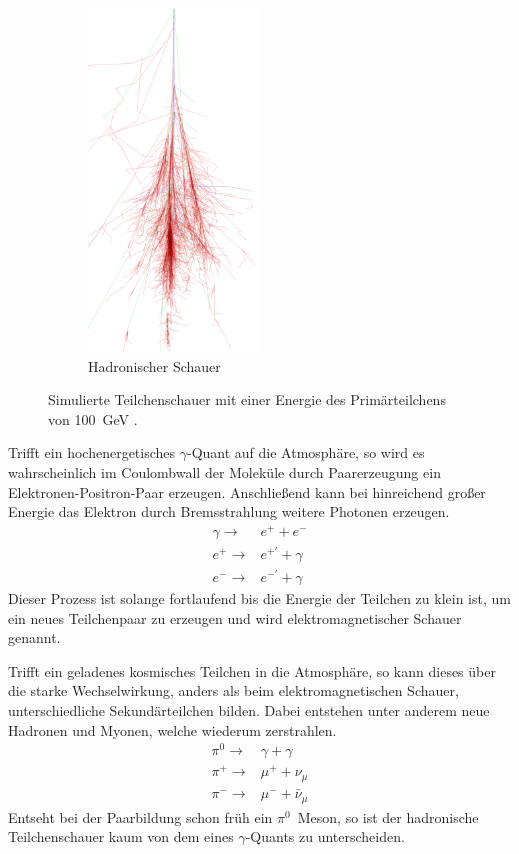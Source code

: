 \begin{figure}[H]
\begin{subfigure}[t]{0.49\textwidth}
	\includegraphics[width=0.5\textwidth]{images/proton_100GeV.png}
	\caption{Hadronischer Schauer}
  \end{subfigure}
  \caption{Simulierte Teilchenschauer mit einer Energie des Primärteilchens von \SI{100}{\giga \electronvolt} \cite{corsika}.}
\end{figure}
Trifft ein hochenergetisches $\gamma$-Quant auf die Atmosphäre, so wird es wahrscheinlich im Coulombwall der Moleküle durch Paarerzeugung ein Elektronen-Positron-Paar erzeugen. 
Anschließend kann bei hinreichend großer Energie das Elektron durch Bremsstrahlung weitere Photonen erzeugen. 
\begin{eqnarray}
  \gamma \rightarrow& e^{+} + e^{-} \\
  e^{+} \rightarrow& e^{+'} + \gamma \\
  e^{-} \rightarrow& e^{-'} + \gamma 
\end{eqnarray}
Dieser Prozess ist solange fortlaufend bis die Energie der Teilchen zu klein ist, um ein neues Teilchenpaar zu erzeugen und wird elektromagnetischer Schauer genannt.

Trifft ein geladenes kosmisches Teilchen in die Atmosphäre, so kann dieses über die starke Wechselwirkung, anders als beim elektromagnetischen Schauer, unterschiedliche Sekundärteilchen bilden. 
Dabei entstehen unter anderem neue Hadronen und Myonen, welche wiederum zerstrahlen. 
\begin{eqnarray}
  \pi^{0} \rightarrow& \gamma + \gamma \\
  \pi^{+} \rightarrow& \mu^{+} + \nu_{\mu} \\
  \pi^{-} \rightarrow& \mu^{-} + \bar{\nu}_{\mu}
\end{eqnarray}
Entseht bei der Paarbildung schon früh ein $\pi^{0}$~Meson, so ist der hadronische Teilchenschauer kaum von dem eines $\gamma$-Quants zu unterscheiden. 


